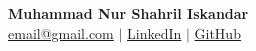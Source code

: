\documentclass[../main.tex]{subfiles}
\begin{document}
\begin{center}
    \textbf{\fontsize{14}{14}\selectfont Muhammad Nur Shahril Iskandar} \\ \vspace{3pt}
    \small
    \faEnvelope \hspace{.5pt} \href{mailto:}{email@gmail.com}
    $|$
    \faLinkedin \hspace{.5pt} \href{https://www.linkedin.com/in/shahril-iskandar}{LinkedIn}
    $|$
    \faGithub \hspace{.5pt} \href{https://github.com/Shahril-Iskandar}{GitHub}
\end{center}
\end{document}
